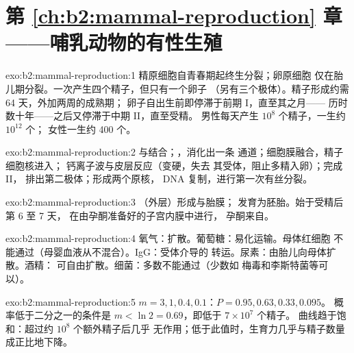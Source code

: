 \section*{第 \ref{ch:b2:mammal-reproduction} 章——哺乳动物的有性生殖}

\begin{solution}{exo:b2:mammal-reproduction:1}
精原细胞自青春期起终生分裂；卵原细胞
仅在胎儿期分裂。一次产生四个精子，但只有一个卵子
（另有三个极体）。精子形成约需 64 天，外加两周的成熟期；
卵子自出生前即停滞于前期 I，直至其之月——
历时数十年——之后又停滞于中期 II，直至受精。
男性每天产生 $10^{8}$ 个精子，一生约 $10^{12}$ 个；
女性一生约 400 个。
\end{solution}

\begin{solution}{exo:b2:mammal-reproduction:2}
与结合；，消化出一条
通道；细胞膜融合，精子细胞核进入；
钙离子波与皮层反应（变硬，失去
其受体，阻止多精入卵）；完成 II，
排出第二极体；形成两个原核，
DNA 复制，进行第一次有丝分裂。
\end{solution}

\begin{solution}{exo:b2:mammal-reproduction:3}
（外层）形成与胎膜；
发育为胚胎。始于受精后第 6 至 7 天，
在由孕酮准备好的子宫内膜中进行，
孕酮来自。
\end{solution}

\begin{solution}{exo:b2:mammal-reproduction:4}
氧气：扩散。葡萄糖：易化运输。母体红细胞
不能通过（母婴血液从不混合）。IgG：受体介导的
转运。尿素：由胎儿向母体扩散。酒精：
可自由扩散。细菌：多数不能通过（少数如
梅毒和李斯特菌等可以）。
\end{solution}

\begin{solution}{exo:b2:mammal-reproduction:5}
$m = 3, 1, 0.4, 0.1$：$P = 0.95, 0.63, 0.33, 0.095$。
概率低于二分之一的条件是 $m < \ln 2 = 0.69$，即低于 $7\times 10^{7}$ 个精子。
曲线趋于饱和：超过约 $10^{8}$ 个额外精子后几乎
无作用；低于此值时，生育力几乎与精子数量成正比地下降。
\end{solution}

